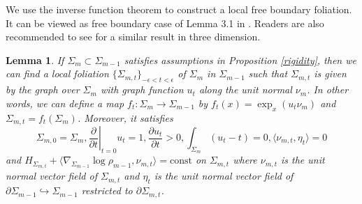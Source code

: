 \documentclass[11pt,letterpaper]{amsart}
\newtheorem{lemma}[theorem]{Lemma}
\theoremstyle{definition}
\theoremstyle{remark}
\numberwithin{equation}{section}
\begin{document}
We use the inverse function theorem to construct a local free boundary foliation. It can be viewed as free boundary case of Lemma 3.1 in \cite{ChuKwongLeerigidity}. Readers are also recommended to see \cite{lucasrigiditythree} for a similar result in three dimension.
\begin{lemma}\label{foliation}
    If $\Sigma_{m}\subset \Sigma_{m-1}$ satisfies assumptions in Proposition \ref{rigidity}, then we can find a local foliation $\{\Sigma_{m,t}\}_{-\epsilon<t<\epsilon}$ of $\Sigma_{m}$ in $\Sigma_{m-1}$ such that $\Sigma_{m,t}$ is given by the graph over $\Sigma_m$ with graph function $u_t$ along the unit normal $\nu_m$. In other words, we can define a map $f_{t}:\Sigma_{m}\rightarrow \Sigma_{m-1}$ by $f_{t}(x)=\exp_{x}(u_{t}\nu_{m})$ and $\Sigma_{m,t} = f_{t}(\Sigma_{m})$. Moreover, it satisfies $$\Sigma_{m,0}=\Sigma_{m}, \left.\frac{\partial}{\partial t}\right|_{t=0}u_{t}=1, \frac{\partial u_{t}}{\partial t}>0, \int_{\Sigma_{m}}(u_{t}-t)=0, \langle \nu_{m,t},\eta_{t}\rangle=0$$ and $H_{\Sigma_{m,t}}+\langle \nabla_{\Sigma_{m-1}}\log \rho_{m-1},\nu_{m,t}\rangle = \text{const}$ on $\Sigma_{m,t}$ where $\nu_{m,t}$ is the unit normal vector field of $\Sigma_{m,t}$ and $\eta
    _{t}$ is the unit normal vector field of $\partial \Sigma_{m-1}\hookrightarrow \Sigma_{m-1}$ restricted to $\partial \Sigma_{m,t}$.
\end{lemma}
\end{document}
